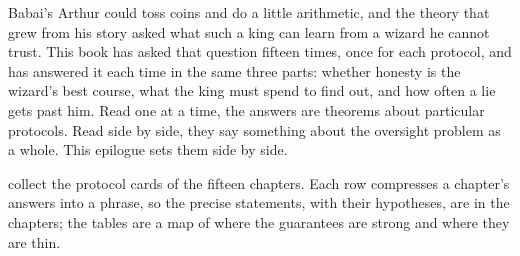 \label{ch:epilogue}
\begin{refsection}

Babai's Arthur could toss coins and do a little arithmetic, and the theory that grew from his story asked what such a king can learn from a wizard he cannot trust. This book has asked that question fifteen times, once for each protocol, and has answered it each time in the same three parts: whether honesty is the wizard's best course, what the king must spend to find out, and how often a lie gets past him. Read one at a time, the answers are theorems about particular protocols. Read side by side, they say something about the oversight problem as a whole. This epilogue sets them side by side.


 collect the protocol cards of the fifteen chapters. Each row compresses a chapter's answers into a phrase, so the precise statements, with their hypotheses, are in the chapters; the tables are a map of where the guarantees are strong and where they are thin.


\end{refsection}
